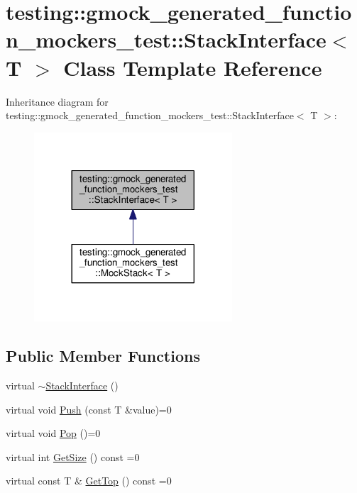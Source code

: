 \hypertarget{classtesting_1_1gmock__generated__function__mockers__test_1_1StackInterface}{}\section{testing\+:\+:gmock\+\_\+generated\+\_\+function\+\_\+mockers\+\_\+test\+:\+:Stack\+Interface$<$ T $>$ Class Template Reference}
\label{classtesting_1_1gmock__generated__function__mockers__test_1_1StackInterface}


Inheritance diagram for testing\+:\+:gmock\+\_\+generated\+\_\+function\+\_\+mockers\+\_\+test\+:\+:Stack\+Interface$<$ T $>$\+:
\nopagebreak
\begin{figure}[H]
\begin{center}
\leavevmode
\includegraphics[width=209pt]{classtesting_1_1gmock__generated__function__mockers__test_1_1StackInterface__inherit__graph}
\end{center}
\end{figure}
\subsection*{Public Member Functions}
\begin{DoxyCompactItemize}
\item 
virtual \hyperlink{classtesting_1_1gmock__generated__function__mockers__test_1_1StackInterface_a87b83db3e9cb1c986d6b0649b37cfa7c}{$\sim$\+Stack\+Interface} ()
\item 
virtual void \hyperlink{classtesting_1_1gmock__generated__function__mockers__test_1_1StackInterface_a49448f6195021fee947d37b80b6e5d30}{Push} (const T \&value)=0
\item 
virtual void \hyperlink{classtesting_1_1gmock__generated__function__mockers__test_1_1StackInterface_a1a6646d1d9febe90c607b9b3e4539b67}{Pop} ()=0
\item 
virtual int \hyperlink{classtesting_1_1gmock__generated__function__mockers__test_1_1StackInterface_a537ec8647a2333f50e5f923a85b90eba}{Get\+Size} () const =0
\item 
virtual const T \& \hyperlink{classtesting_1_1gmock__generated__function__mockers__test_1_1StackInterface_af36e32b9ae568100363466d1ebf95364}{Get\+Top} () const =0
\end{DoxyCompactItemize}


